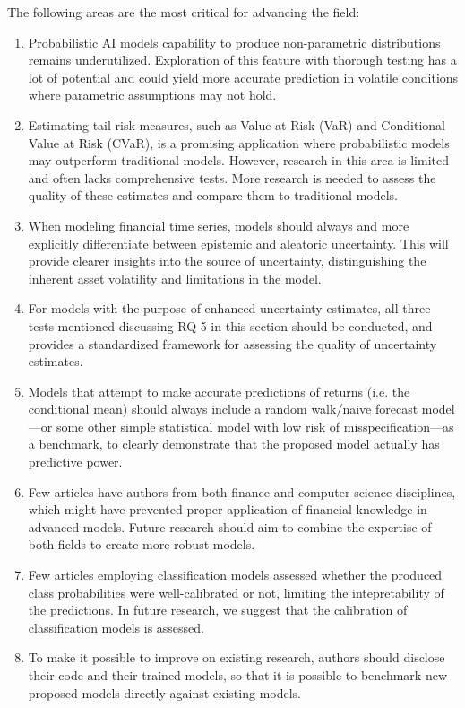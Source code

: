The following areas are the most critical for advancing the field:
\begin{enumerate}
    \item Probabilistic AI models capability to produce non-parametric distributions remains underutilized. Exploration of this feature with thorough testing has a lot of potential and could yield more accurate prediction in volatile conditions where parametric assumptions may not hold.
    \item Estimating tail risk measures, such as Value at Risk (VaR) and Conditional Value at Risk (CVaR), is a promising application where probabilistic models may outperform traditional models. However, research in this area is limited and often lacks comprehensive tests. More research is needed to assess the quality of these estimates and compare them to traditional models.
    \item When modeling financial time series, models should always and more explicitly differentiate between epistemic and aleatoric uncertainty. This will provide clearer insights into the source of uncertainty, distinguishing the inherent asset volatility and limitations in the model.
    \item For models with the purpose of enhanced uncertainty estimates, all three tests mentioned discussing RQ 5 in this section should be conducted, and provides a standardized framework for assessing the quality of uncertainty estimates.
    \item Models that attempt to make accurate predictions of returns (i.e. the conditional mean) should always include a random walk/naive forecast model—or some other simple statistical model with low risk of misspecification—as a benchmark, to clearly demonstrate that the proposed model actually has predictive power.
    \item Few articles have authors from both finance and computer science disciplines, which might have prevented proper application of financial knowledge in advanced models. Future research should aim to combine the expertise of both fields to create more robust models.
    \item Few articles employing classification models assessed whether the produced class probabilities were well-calibrated or not, limiting the intepretability of the predictions. In future research, we suggest that the calibration of classification models is assessed.
    \item To make it possible to improve on existing research, authors should disclose their code and their trained models, so that it is possible to benchmark new proposed models directly against existing models.

\end{enumerate}
